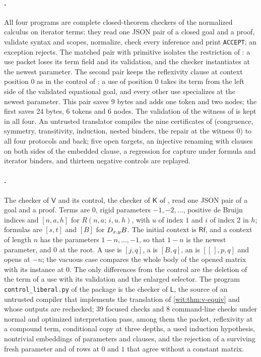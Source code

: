 \paragraph{.}
All four programs are complete closed-theorem checkers of the normalized
calculus on iterator terms: they read one JSON pair of a closed goal and a
proof, validate syntax and scopes, normalize, check every inference and
print \texttt{ACCEPT}; an exception rejects.  The matched pair with
primitive  isolates the restriction of : a use
packet loses its term field and its validation, and the checker
instantiates at the newest parameter.  The second pair keeps the
reflexivity clause at context position $0$ as in the control of
; a use of position $0$ takes its term from the left
side of the validated equational goal, and every other use specializes at
the newest parameter.  This pair saves 9 bytes and adds one token and two
nodes; the first saves 24 bytes, 6 tokens and 6 nodes.  The validation of
the witness of  is kept in all four.  An untrusted
translator compiles the nine certificates of 
(congruence, symmetry, transitivity, induction, nested binders, the repair
at the witness $0$) to all four protocols and back; five open targets, an
injective renaming with clauses on both sides of the embedded clause, a
regression for capture under formula and iterator binders, and thirteen
negative controls are replayed.

\paragraph{.}
The checker of $\mathsf V$ and its control, the checker of $\mathsf K$ of
, read one JSON pair of a goal and a proof.  Terms
are $0$, rigid parameters $-1,-2,\dots$, positive de Bruijn indices and
$[n,a,h]$ for $R(n,a;\,i,u.\,h)$, with $u$ of index $1$ and $i$ of index $2$
in $h$; formulas are $[s,t]$ and $[B]$ for $D_{x,y}B$.  The initial
context is $\mathsf{Rf}$, and a context of length $n$ has the parameters
$1-n,\dots,-1$, so that $1-n$ is the newest parameter, and $0$ at the root.
A use is $[j,q]$, a  is $[B,q]$, an  is
$[[\,],p,q]$ and opens at $-n$; the vacuous case compares the whole body of
the opened matrix with its instance at $0$.  The only differences from the
control are the deletion of the term of a use with its validation and the
enlarged selector.  The program \texttt{control\_liberal.py} of the package
is the checker of $\mathsf L$, the source of an untrusted compiler that implements the
translation of \cref{wit:thm:v-equiv} and whose outputs are rechecked; 39
focused checks and 8 command-line checks under normal and optimized
interpretation pass, among them the packet, reflexivity at a compound term,
conditional copy at three depths, a used induction hypothesis, nontrivial
embeddings of parameters and clauses, and the rejection of a surviving
fresh parameter and of rows at $0$ and $1$ that agree without a constant
matrix.

